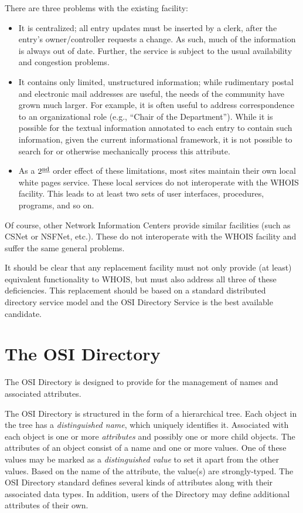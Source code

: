 There are three problems with the existing facility:
\begin{itemize}
\item	It is centralized; all entry updates must be inserted by a clerk,
        after the entry's owner/controller requests a change.
	As such, much of the information is always out of date.
	Further, the service is subject to the usual availability and
	congestion problems.

\item	It contains only limited, unstructured information;
	while rudimentary postal and electronic mail addresses are useful,
	the needs of the community have grown much larger.
	For example,
	it is often useful to address correspondence to an organizational
	role (e.g., ``Chair of the Department'').
	While it is possible for the textual information annotated to each
	entry to contain such information,
	given the current informational framework,
	it is not possible to search for or otherwise mechanically process
	this attribute.

\item	As a $2^{\underline{\mbox{\scriptsize nd}}}$ order effect of these
	limitations,
	most sites maintain their own local white pages service.
	These local services do not interoperate with the WHOIS facility.
	This leads to at least two
        sets of user interfaces, procedures, programs, and so on.
\end{itemize}
Of course,
other Network Information Centers provide similar facilities
(such as CSNet or NSFNet, etc.).
These do not interoperate with the WHOIS facility
and suffer the same general problems.

It should be clear that any replacement facility must not only provide
(at least) equivalent functionality to WHOIS,
but must also address all three of these deficiencies.
This replacement
should be based on a standard distributed directory service model and
the OSI Directory Service is the best available candidate.

\section	{The OSI Directory}
The OSI Directory is designed to provide
for the management of names and associated attributes.

The OSI Directory is structured in the form of a hierarchical tree.
Each object in the tree has a {\em distinguished name},
which uniquely identifies it.
Associated with each object is one or more {\em attributes}
and possibly one or more child objects.
The attributes of an object consist of a name and one or more values.
One of these values may be marked as a {\em distinguished value} to set it
apart from the other values.
Based on the name of the attribute,
the value(s) are strongly-typed.
The OSI Directory standard defines several kinds of attributes along with their
associated data types.
In addition,
users of the Directory may define additional attributes of their own.

